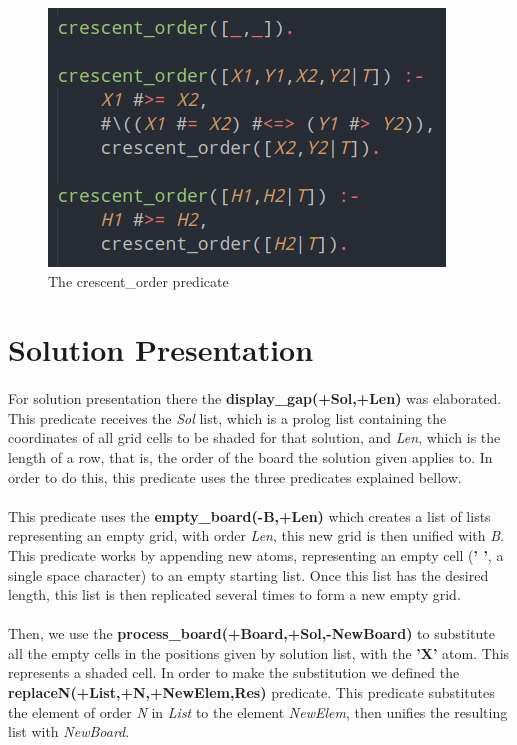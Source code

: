\documentclass[runningheads]{llncs}
\begin{document}
\begin{figure}
    \begin{center}
        \includegraphics[scale=0.5]{images/crescent.png}
        \caption{The crescent\_order predicate} \label{fig4}
    \end{center}
\end{figure}


\section{Solution Presentation}
\paragraph{}
For solution presentation there the \textbf{display\_gap(+Sol,+Len)} was elaborated. This predicate receives the \textit{Sol}
list, which is a prolog list containing the coordinates of all grid cells to be shaded for that solution, and \textit{Len},
which is the length of a row, that is, the order of the board the solution given applies to. In order to do this, this 
predicate uses the three predicates explained bellow.

\paragraph{}
This predicate uses the \textbf{empty\_board(-B,+Len)} which creates a list of lists representing an empty grid, with order \textit{Len},
this new grid is then unified with \textit{B}. This predicate works by appending new atoms, representing an empty cell (\textbf{' '}, 
a single space character) to an empty starting list. Once this list has the desired length, this list is then replicated 
several times to form a new empty grid.

\paragraph{}
Then, we use the \textbf{process\_board(+Board,+Sol,-NewBoard)} to substitute all the empty cells in the positions given
by solution list, with the \textbf{'X'} atom. This represents a shaded cell. In order to make the substitution we defined
the \textbf{replaceN(+List,+N,+NewElem,Res)} predicate. This predicate substitutes the element of order \textit{N} in 
\textit{List} to the element \textit{NewElem}, then unifies the resulting list with \textit{NewBoard}.
\end{document}
